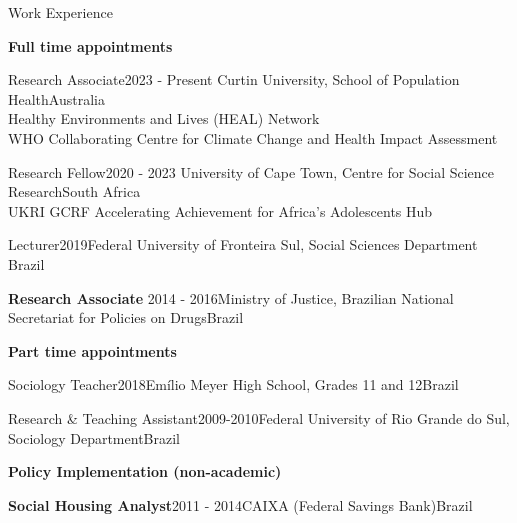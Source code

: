 \begin{rSection}{Work Experience}

\large \diamondsep{} \textbf {Full time appointments}

\begin{rSubsection}
{Research Associate}{2023 - Present}
{Curtin University, School of Population Health}{Australia}\\
Healthy Environments and Lives (HEAL) Network\\
WHO Collaborating Centre for Climate Change and Health Impact Assessment
\end{rSubsection}

\begin{rSubsection}
{Research Fellow}{2020 - 2023}
{University of Cape Town, Centre for Social Science Research}{South Africa}\\
UKRI GCRF Accelerating Achievement for Africa's Adolescents Hub
\end{rSubsection}

\begin{rSubsection}{Lecturer}{2019}{Federal University of Fronteira Sul, Social Sciences Department} {Brazil}\par
\end{rSubsection}

\begin{rSubsection}{\textbf{Research Associate}}{ 2014 - 2016}{Ministry of Justice, Brazilian National Secretariat for Policies on Drugs}{Brazil}\par
\end{rSubsection}

\vspace{1em}
\large \diamondsep{} \textbf {Part time appointments}
\par

\begin{rSubsection}{Sociology Teacher}{2018}{Emílio Meyer High School, Grades 11 and 12}{Brazil}\par
\end{rSubsection}

\begin{rSubsection}{Research \& Teaching Assistant}{2009-2010}{Federal University of Rio Grande do Sul, Sociology Department}{Brazil}\par
\end{rSubsection}

\vspace{1em}
\large  \diamondsep{} \textbf {Policy Implementation (non-academic)}
\par

\begin{rSubsection}{\textbf{Social Housing Analyst}}{2011 -  2014}{CAIXA (Federal Savings Bank)}{Brazil}\par
\end{rSubsection}

\end{rSection}